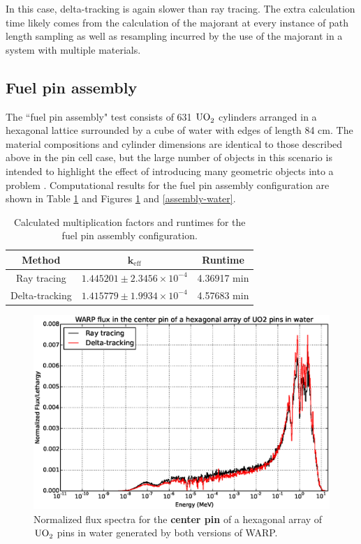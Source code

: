 In this case, delta-tracking is again slower than ray tracing. The extra calculation time likely
comes from the calculation of the majorant at every instance of path length sampling as well as resampling
incurred by the use of the majorant in a system with multiple materials.

\subsection{Fuel pin assembly}

The ``fuel pin assembly" test consists of 631 $\ce{UO_2}$ cylinders arranged in a hexagonal lattice
surrounded by a cube of water with edges of length 84 cm. The material compositions and cylinder 
dimensions are identical to those described above in the pin cell case, but the large number of objects in
this scenario is intended to highlight the effect of introducing many geometric objects into a problem
\cite{warp2015}. Computational results for the fuel pin assembly configuration are shown in Table 
\ref{hex_table} and Figures \ref{assembly-centerpin} and \ref{assembly-water}.

\begin{table}[h!]
\centering
\caption{Calculated multiplication factors and runtimes for the fuel pin assembly configuration.}
\label{hex_table}
\begin{tabular}{| c | c | c |}
\hline
\textbf{Method} & $\mathbf{k_{\mathrm{eff}}}$ & \textbf{Runtime} \\
\hline
Ray tracing & $1.445201 \pm 2.3456 \times 10^{-4}$ & 4.36917 min \\
Delta-tracking & $1.415779 \pm 1.9934 \times 10^{-4}$ & 4.57683 min \\
\hline
\end{tabular}
\end{table}

\begin{figure}[h!]
\includegraphics[width=\textwidth]{img/assembly-centerpin.eps}
\caption{Normalized flux spectra for the \textbf{center pin} of a hexagonal array of $\ce{UO_2}$ 
pins in water generated by both versions of WARP. \label{assembly-centerpin}}
\end{figure}

